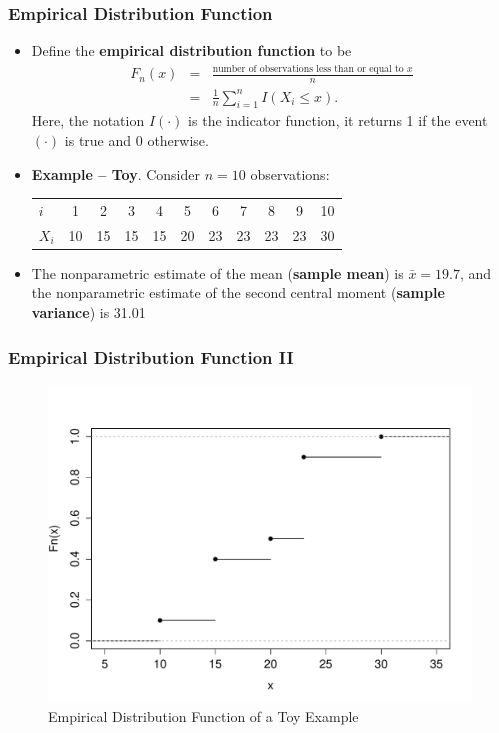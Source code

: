 \documentclass{beamer}
\begin{document}
\begin{frame}%
\frametitle{Empirical Distribution Function}
\begin{itemize}
\item Define the \textbf{empirical distribution function} to be
\begin{eqnarray*}
F_n(x) &=& \frac{\text{number of observations less than or equal to }x}{n} \\
&=& \frac{1}{n} \sum_{i=1}^n I\left(X_i \le x\right).
\end{eqnarray*}
Here, the notation $I(\cdot)$ is the indicator function, it returns 1 if the event $(\cdot)$ is true and 0 otherwise.
\item\textbf{Example -- Toy}. Consider $n=10$ observations:

\begin{table}[H]\begin{center}
    \begin{tabular}{l|cccccccccc}
    \hline
$i$ &1&2&3&4&5&6&7&8&9&10 \\
$X_i$& 10 &15 &15 &15 &20 &23 &23 &23 &23 &30\\
    \hline
    \end{tabular}\end{center} \end{table}
\item The nonparametric estimate of the mean (\textbf{sample mean}) is $\bar{x} = 19.7$, and the nonparametric estimate of the second central moment (\textbf{sample variance}) is
31.01
\end{itemize}

\end{frame}

\begin{frame}[shrink=2]
\frametitle{Empirical Distribution Function II}
\begin{figure}[htp]
\begin{center}
    \includegraphics[scale = 0.4, bb = 600 520 100 100]{Figures/EDFExample.pdf}
     \caption{\label{F:EDFToy}Empirical Distribution Function of a Toy Example}
\end{center}
\end{figure}
\end{frame}
\end{document}
